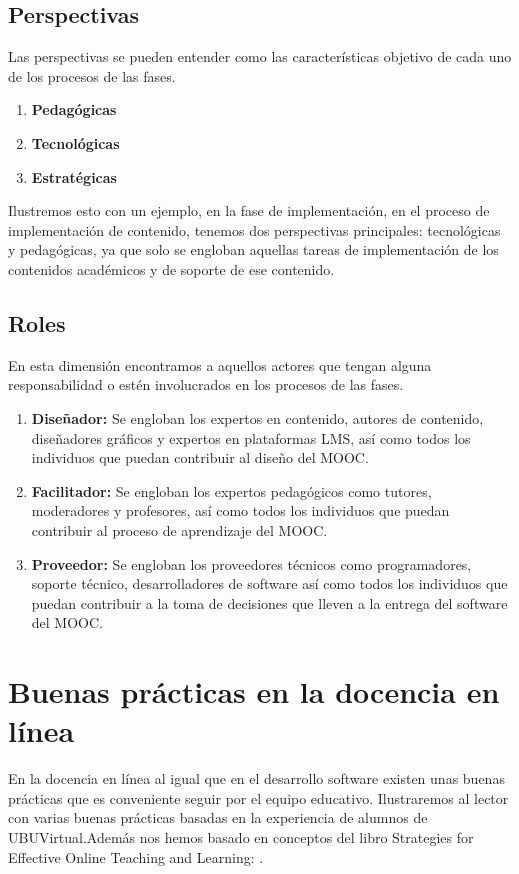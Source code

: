 \subsection{Perspectivas}
Las perspectivas se pueden entender como las características objetivo de cada uno de los procesos de las fases.

\begin{enumerate}
    \item \textbf{Pedagógicas}
    \item \textbf{Tecnológicas}
    \item \textbf{Estratégicas}
\end{enumerate}

Ilustremos esto con un ejemplo, en la fase de implementación, en el proceso de implementación de contenido, tenemos dos perspectivas principales: tecnológicas y pedagógicas, ya que solo se engloban aquellas tareas de implementación de los contenidos académicos y de soporte de ese contenido.

\subsection{Roles}
En esta dimensión encontramos a aquellos actores que tengan alguna responsabilidad o estén involucrados en los procesos de las fases.
\begin{enumerate}
    \item \textbf{Diseñador:} Se engloban los expertos en contenido, autores de contenido, diseñadores gráficos y expertos en plataformas LMS, así como todos los individuos que puedan contribuir al diseño del MOOC.
    \item \textbf{Facilitador:} Se engloban los expertos pedagógicos como tutores, moderadores y profesores, así como todos los individuos que puedan contribuir al proceso de aprendizaje del MOOC.
    \item \textbf{Proveedor:} Se engloban los proveedores técnicos como programadores, soporte técnico, desarrolladores de software así como todos los individuos que puedan contribuir a la toma de decisiones que lleven a la entrega del software del MOOC.
\end{enumerate}

\section{Buenas prácticas en la docencia en línea}
En la docencia en línea al igual que en el desarrollo software existen unas buenas prácticas que es conveniente seguir por el equipo educativo. Ilustraremos al lector con varias buenas prácticas basadas en la experiencia de alumnos de UBUVirtual\cite{ubu-virtual}.Además nos hemos basado en conceptos del libro Strategies for Effective Online Teaching and Learning: \cite{inbook}.
